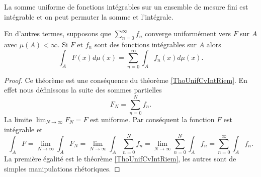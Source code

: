 \begin{theorem}      \label{ThoCciOlZ}
    La somme uniforme de fonctions intégrables sur un ensemble de mesure fini est intégrable et on peut permuter la somme et l'intégrale.

    En d'autres termes, supposons que \( \sum_{n=0}^{\infty}f_n\) converge uniformément vers \( F\) sur \( A\) avec \( \mu(A)<\infty\). Si \( F\) et \( f_n\) sont des fonctions intégrables sur \( A\) alors
    \begin{equation}
        \int_AF(x)d\mu(x)=\sum_{n=0}^{\infty}\int_Af_n(x)d\mu(x).
    \end{equation}
\end{theorem}

\begin{proof}
    Ce théorème est une conséquence du théorème \ref{ThoUnifCvIntRiem}. En effet nous définissons la suite des sommes partielles
    \begin{equation}
        F_N=\sum_{n=0}^Nf_n.
    \end{equation}
    La limite \( \lim_{N\to \infty} F_N=F\) est uniforme. Par conséquent la fonction \( F\) est intégrable et
    \begin{equation}
        \int_A F=\lim_{N\to \infty} \int_AF_N=\lim_{N\to \infty} \int_A\sum_{n=0}^Nf_n=\lim_{N\to \infty} \sum_{n=0}^N\int_Af_n=\sum_{n=0}^{\infty}\int_Af_n.
    \end{equation}
    La première égalité est le théorème \ref{ThoUnifCvIntRiem}, les autres sont de simples manipulations rhétoriques.
\end{proof}


